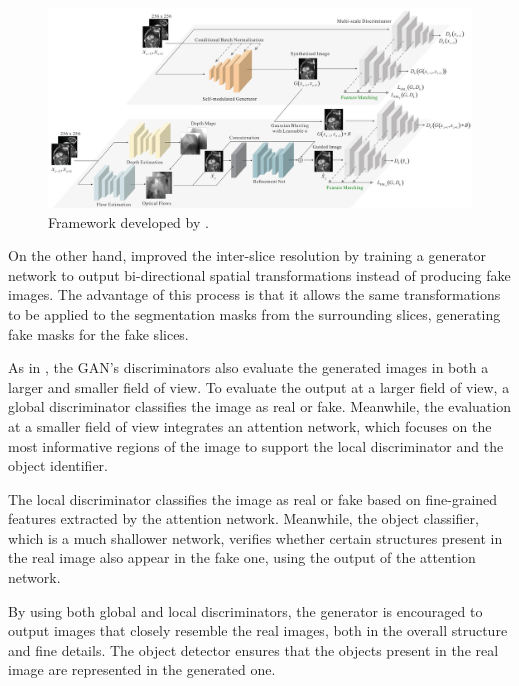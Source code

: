 \begin{figure}[!ht]
	\hspace*{-0.35in}
	\includegraphics[width=1.1\linewidth]{figures/XiaFramework.png}
	\caption{Framework developed by \textcite{Xia2021}.}
	\label{fig:XiaFramework}
\end{figure}

\par
On the other hand, \textcite{Wu2022} improved the inter-slice resolution by training a generator network to output bi-directional spatial transformations instead of producing fake images. The advantage of this process is that it allows the same transformations to be applied to the segmentation masks from the surrounding slices, generating fake masks for the fake slices. 
\par
As in \textcite{Xia2021}, the GAN's discriminators also evaluate the generated images in both a larger and smaller field of view. To evaluate the output at a larger field of view, a global discriminator classifies the image as real or fake. Meanwhile, the evaluation at a smaller field of view integrates an attention network, which focuses on the most informative regions of the image to support the local discriminator and the object identifier. 
\par
The local discriminator classifies the image as real or fake based on fine-grained features extracted by the attention network. Meanwhile, the object classifier, which is a much shallower network, verifies whether certain structures present in the real image also appear in the fake one, using the output of the attention network. 
\par
By using both global and local discriminators, the generator is encouraged to output images that closely resemble the real images, both in the overall structure and fine details. The object detector ensures that the objects present in the real image are represented in the generated one.

